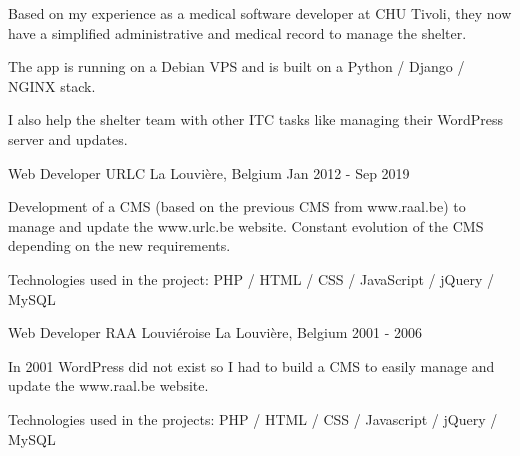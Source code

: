 \begin{cventries}
{Based on my experience as a medical software developer at CHU Tivoli, they now have a simplified administrative and medical record to manage the shelter. 

The app is running on a Debian VPS and is built on a Python / Django / NGINX stack.

I also help the shelter team with other ITC tasks like managing their WordPress server and updates.

    }

  \cventry
    {Web Developer} %
    {URLC} %
    {La Louvière, Belgium} %
    {Jan 2012 - Sep 2019} %
    {
Development of a CMS (based on the previous CMS from www.raal.be) to manage and update the www.urlc.be website. Constant evolution of the CMS depending on the new requirements. 

Technologies used in the project: PHP / HTML / CSS / JavaScript / jQuery / MySQL

    }

  \cventry
    {Web Developer} %
    {RAA Louviéroise} %
    {La Louvière, Belgium} %
    {2001 - 2006} %
    {
In 2001 WordPress did not exist so I had to build a CMS to easily manage and update the www.raal.be website.

Technologies used in the projects: PHP / HTML / CSS / Javascript / jQuery / MySQL

    }
\end{cventries}
